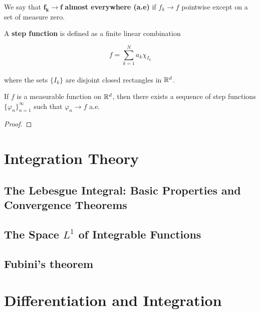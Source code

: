 \documentclass[12pt, a4paper, openany, twoside]{book}
\theoremstyle{definition}
\theoremstyle{remark}
\theoremstyle{plain}
\numberwithin{equation}{section}
\begin{document}
\vspace{5mm}
\begin{tcolorbox}[colback=yellow!10!white,colframe=blue!75!black,title=Definition 1.4.5]\label{Definition 1.4.5}
    We say that $\boldsymbol{f_k\rightarrow f}$ \textbf{almost everywhere (a.e)} if $f_k\rightarrow f$ pointwise except on a set of measure zero.
\end{tcolorbox}
\vspace{5mm}
\begin{tcolorbox}[colback=yellow!10!white,colframe=blue!75!black,title=Definition 1.4.6]\label{Definition 1.4.6}
    A \textbf{step function} is defined as a finite linear combination

    \[f=\sum_{k=1}^{N}{a_k\chi_{I_k}}\]
    \\
    where the sets $\{I_k\}$ are disjoint closed rectangles in ${\mathbb {R}}^d$.
\end{tcolorbox}
\vspace{5mm}
\begin{tcolorbox}[colback=yellow!10!white,colframe=red!75!black,title=Theorem 1.4.10]\label{Theorem 1.4.10}
    If $f$ is a measurable function on ${\mathbb {R}}^d$, then there exists a sequence of step functions $\{\varphi_n\}_{n=1}^{\infty}$ such that $\varphi_n\rightarrow f$ a.e. 
\end{tcolorbox}
\begin{proof}
    
\end{proof}


\newpage



\chapter{Integration Theory}
\section{The Lebesgue Integral: Basic Properties and Convergence Theorems}
\section{The Space $L^1$ of Integrable Functions}
\section{Fubini's theorem}

\newpage

\chapter{Differentiation and Integration}
\end{document}
